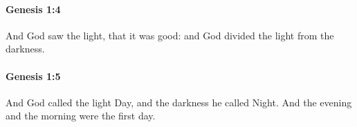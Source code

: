 		\paragraph{Genesis 1:4} %
			\label{GENESIS-1-4}

			And God saw the light, that it was good: and God divided the light from the darkness.


		\paragraph{Genesis 1:5} %
			\label{GENESIS-1-5}

			And God called the light Day, and the darkness he called Night. And the evening and the morning were the first day.


